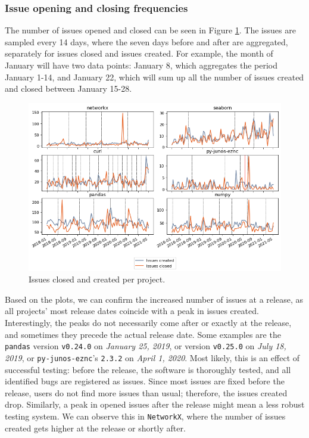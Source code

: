 \subsubsection{Issue opening and closing frequencies}

The number of issues opened and closed can be seen in Figure \ref{fig:issues_created_closed}. The issues are sampled every 14 days, where the seven days before and after are aggregated, separately for issues closed and issues created. For example, the month of January will have two data points: January 8, which aggregates the period January 1-14, and January 22, which will sum up all the number of issues created and closed between January 15-28.

\begin{figure}[!htbp]
    \centering
    \includegraphics[width=\textwidth]{figures/qualitative/issues_closed_created/issues.png}
    \caption{Issues closed and created per project.}
    \label{fig:issues_created_closed}
\end{figure}

Based on the plots, we can confirm the increased number of issues at a release, as all projects' most release dates coincide with a peak in issues created. Interestingly, the peaks do not necessarily come after or exactly at the release, and sometimes they precede the actual release date. Some examples are the \texttt{pandas} version \texttt{v0.24.0} on \textit{January 25, 2019}, or version \texttt{v0.25.0} on \textit{July 18, 2019}, or \texttt{py-junos-eznc}'s \texttt{2.3.2} on \textit{April 1, 2020}. Most likely, this is an effect of successful testing: before the release, the software is thoroughly tested, and all identified bugs are registered as issues. Since most issues are fixed before the release, users do not find more issues than usual; therefore, the issues created drop. Similarly, a peak in opened issues after the release might mean a less robust testing system. We can observe this in \texttt{NetworkX}, where the number of issues created gets higher at the release or shortly after.

